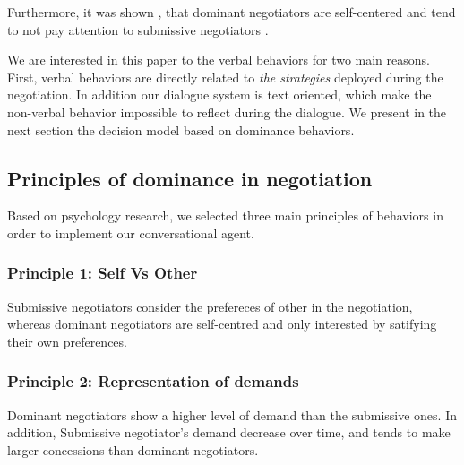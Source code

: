 \documentclass{llncs}
\begin{document}
					 Furthermore, it was shown \cite{fiske1993controlling},\cite{de1995impact} that dominant negotiators are self-centered and tend to not pay attention to submissive negotiators .
%					
					\par We are interested in this paper to the verbal behaviors for two main reasons. First, verbal behaviors are directly related to \emph{the strategies} deployed during the negotiation. In addition our dialogue system is text oriented, which make the non-verbal behavior impossible to reflect during the dialogue. 
					We present in the next section the decision model based on dominance behaviors. 
					
					\subsection{Principles of dominance in negotiation}
					Based on psychology research, we selected three main principles of behaviors in order to implement our conversational agent.
					\subsubsection{Principle 1: Self Vs Other}
						Submissive negotiators consider the prefereces of other in the negotiation, whereas dominant negotiators  are self-centred and only interested by satifying their own preferences.
					
					\subsubsection{Principle 2: Representation of demands}
					
%					
					 Dominant negotiators show a higher level of demand than the submissive ones. In addition,  Submissive negotiator's demand decrease over time, and tends to make larger concessions than dominant negotiators.
						
					
					
\end{document}
